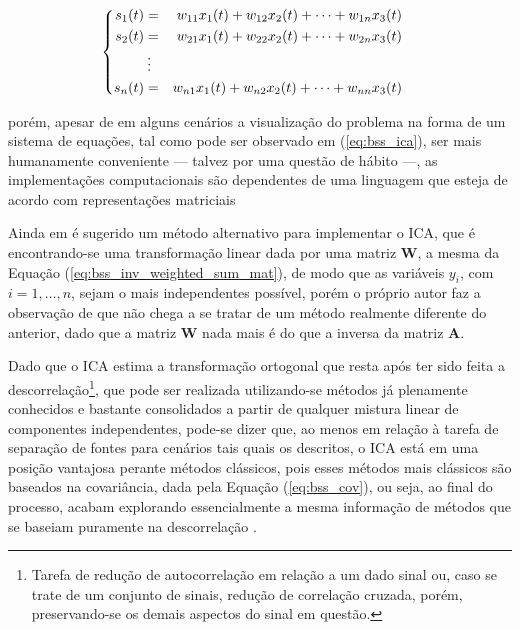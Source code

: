 \begin{equation}
\begin{cases}
\begin{aligned}
    s_{1}(t) & = & w_{11} x_{1}(t) +  w_{12} x_{2}(t) + \cdots + w_{1n} x_{3}(t) \\
    s_{2}(t) & = & w_{21} x_{1}(t) +  w_{22} x_{2}(t) + \cdots + w_{2n} x_{3}(t) \\
     & \hspace{0.08cm} \vdots & \\
    s_{n}(t) & = & w_{n1} x_{1}(t) +  w_{n2} x_{2}(t) + \cdots + w_{nn} x_{3}(t)
    \label{eq:bss_ica}
\end{aligned}
\end{cases}
\vspace{0.2cm}
\end{equation}

\noindent porém, apesar de em alguns cenários a visualização do problema na forma de um sistema de equações, tal como pode ser observado em (\ref{eq:bss_ica}), ser mais humanamente conveniente --- talvez por uma questão de hábito ---, as implementações computacionais são dependentes de uma linguagem que esteja de acordo com representações matriciais

Ainda em \citep{hyvarinen2004independent} é sugerido um método alternativo para implementar o ICA, que é encontrando-se uma transformação linear dada por uma matriz $\mathbf{W}$, a mesma da Equação (\ref{eq:bss_inv_weighted_sum_mat}), de modo que as variáveis $y_{i}$, com $i=1,\dotsc,n$, sejam o mais independentes possível, porém o próprio autor faz a observação de que não chega a se tratar de um método realmente diferente do anterior, dado que a matriz $\mathbf{W}$ nada mais é do que a inversa da matriz $\mathbf{A}$.

Dado que o ICA estima a transformação ortogonal que resta após ter sido feita a descorrelação\footnote{Tarefa de redução de autocorrelação em relação a um dado sinal ou, caso se trate de um conjunto de sinais, redução de correlação cruzada, porém, preservando-se os demais aspectos do sinal em questão.}, que pode ser realizada utilizando-se métodos já plenamente conhecidos e bastante consolidados a partir de qualquer mistura linear de componentes independentes, pode-se dizer que, ao menos em relação à tarefa de separação de fontes para cenários tais quais os descritos, o ICA está em uma posição vantajosa perante métodos clássicos, pois esses métodos mais clássicos são baseados na covariância, dada pela Equação (\ref{eq:bss_cov}), ou seja, ao final do processo, acabam explorando essencialmente a mesma informação de métodos que se baseiam puramente na descorrelação \citep{hyvarinen2004independent}.\\

